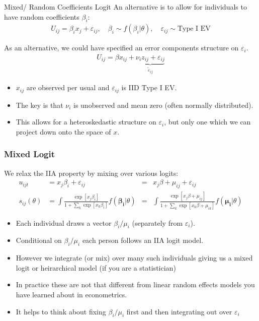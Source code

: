 \documentclass[xcolor=pdftex,dvipsnames,table,mathserif,aspectratio=169]{beamer}
\begin{document}
\begin{frame}{Mixed/ Random Coefficients Logit}
An alternative is to allow for individuals to have \alert{random coefficients} $\beta_i$:
\begin{eqnarray*}
U_{ij} = \beta_i x_{j} +  \varepsilon_{ij}, \quad \beta_i \sim f( \beta_i | \theta),  \quad \varepsilon_{ij} \sim \text{Type I EV}
\end{eqnarray*}

As an alternative, we could have specified an error components structure on $\varepsilon_i$.
\begin{align*}
U_{ij} = \beta x_{ij} + \underbrace{\nu_i z_{ij} + \varepsilon_{ij}}_{\tilde{\varepsilon}_{ij}}
\end{align*}
\vspace{-0.8cm}
\begin{itemize}
\item $x_{ij}$ are observed per usual and $\varepsilon_{ij}$ is IID Type I EV.
\item The key is that $\nu_i$ is unobserved and mean zero (often normally distributed).
\item This allows for a heteroskedastic structure on $\varepsilon_{i}$, but only one which we can project down onto the space of $x$.
\end{itemize}

\end{frame}


\begin{frame}
\frametitle{Mixed Logit}
We relax the IIA property by mixing over various logits:
\begin{align*}
u_{ijt} &= x_j \beta_i + \varepsilon_{ij}  
&=&  x_j \beta  + \mu_{ij}+ \varepsilon_{ij}   \\
s_{ij}(\theta) &= \int \frac{\exp[x_{j} \beta_i ]}{1+\sum_k \exp[x_{k} \beta_i ]} f(\boldsymbol{\beta_i} | \theta) 
&=& \int \frac{\exp[x_{j} \beta + \mu_{ij} ]}{1+\sum_k \exp[x_{k} \beta+ \mu_{ik} ]} f(\boldsymbol{\mu_i} | \theta)
\end{align*}
 \begin{itemize}
 \item Each individual draws a vector $\beta_i/\mu_i$ (separately from $\varepsilon_i$).
 \item Conditional on $\beta_i/\mu_i$ each person follows an IIA logit model.
 \item However we integrate (or mix) over many such individuals giving us a \alert{mixed logit} or \alert{heirarchical model} (if you are a statistician)
 \item In practice these are not that different from linear \alert{random effects models} you have learned about in econometrics.
 \item It helps to think about fixing $\beta_i/\mu_i$ first and then integrating out over $\varepsilon_i$
 \end{itemize}
\end{frame}
\end{document}
